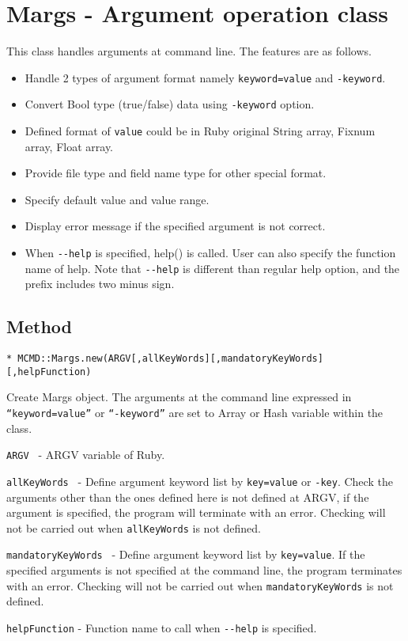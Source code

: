 
%
 \section{Margs - Argument operation class \label{sect:margsRB}}
This class handles arguments at command line. The features are as follows. 
\begin{itemize}
	\item Handle 2 types of argument format namely \verb|keyword=value| and \verb|-keyword|.
	\item Convert Bool type (true/false) data using \verb|-keyword| option. 
	\item Defined format of \verb|value| could be in Ruby original String array, Fixnum array, Float array. 
	\item Provide file type and field name type for other special format.
	\item Specify default value and value range. 
	\item Display error message if the specified argument is not correct. 
	\item When \verb|--help| is specified, help() is called. User can also specify the function name of help. Note that \verb|--help| is different than regular help option, and the prefix includes two minus sign.
\end{itemize}

\subsection{Method}

{\Large
\begin{verbatim}
* MCMD::Margs.new(ARGV[,allKeyWords][,mandatoryKeyWords][,helpFunction)
\end{verbatim}
}

Create Margs object. 
The arguments at the command line expressed in \verb|“keyword=value”| or \verb|“-keyword”| are set to Array or Hash variable within the class. 

\begin{description}
	\setlength{\itemindent}{-5mm}
	\item {\large \verb/ARGV /} - ARGV variable of Ruby.
	\item {\large \verb/allKeyWords /} - Define argument keyword list by \verb/key=value/ or \verb/-key/.
	Check the arguments other than the ones defined here is not defined at ARGV, if the argument is specified, the program will terminate with an error. Checking will not be carried out when  \verb/allKeyWords/ is not defined. 
	\item {\large \verb/mandatoryKeyWords /} - Define argument keyword list by \verb/key=value/.
	 If the specified arguments is not specified at the command line, the program terminates with an error.  Checking will not be carried out when \verb/mandatoryKeyWords/ is not defined. 
	\item {\large \verb/helpFunction/} - Function name to call when \verb/--help/ is specified. 

\end{description}

